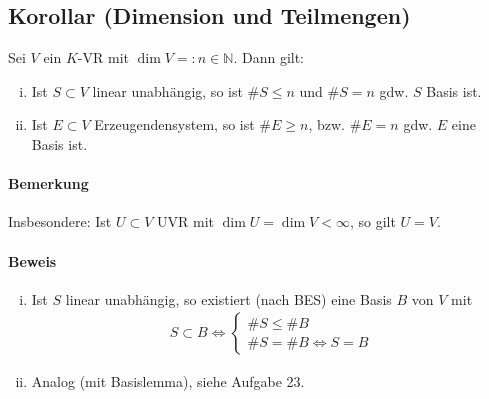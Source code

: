  \subsection{Korollar (Dimension und Teilmengen)}
 	\begin{Korollar}
 		Sei $ V $ ein $ K $-VR mit $\dim V =: n\in \mathbb{N}$. Dann gilt:
 		\begin{enumerate}[(i)]
 			\item Ist $S \subset V$ linear unabhängig, so ist $\# S \leq n$ und $\# S = n$ gdw. $ S $ Basis ist.
 			\item Ist $E \subset V$ Erzeugendensystem, so ist $\#E \geq n$, bzw. $\#E = n$ gdw. $ E $ eine Basis ist.
 		\end{enumerate}
 	\end{Korollar}

 	\paragraph{Bemerkung}
 		Insbesondere: Ist $U\subset V$ UVR mit $\dim U=\dim V < \infty$, so gilt $ U=V $.

 	\paragraph{Beweis}
 		\begin{enumerate}[(i)]
 			\item Ist $ S $ linear unabhängig, so existiert (nach BES) eine Basis $ B $ von $ V $ mit
 			      \begin{gather*}
 			      	S\subset B\Leftrightarrow \left\{
 			      	\begin{array}{l}
 			      		\#S \leq \#B                    \\
 			      		\#S = \#B \Leftrightarrow S = B
 			      	\end{array}
 			      	\right.
 			      \end{gather*}
 			\item Analog (mit Basislemma), siehe Aufgabe 23.
 		\end{enumerate}
